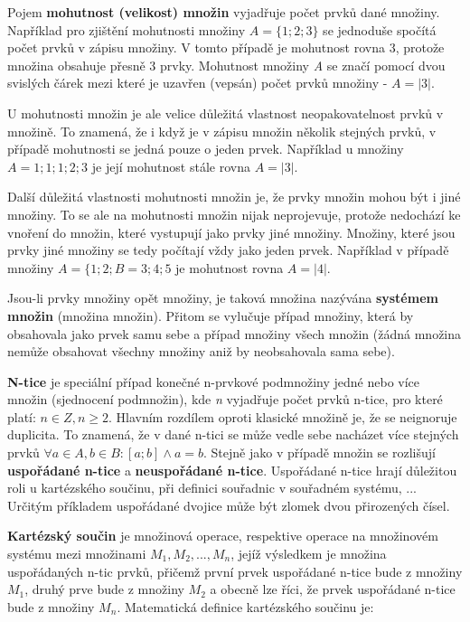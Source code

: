 Pojem {\bf mohutnost (velikost) množin} vyjadřuje počet prvků dané množiny. Například pro zjištění mohutnosti množiny $A = \{1; 2; 3\}$ se jednoduše spočítá počet prvků v zápisu množiny. V tomto případě je mohutnost rovna 3, protože množina obsahuje přesně 3 prvky. Mohutnost množiny {\it A} se značí pomocí dvou svislých čárek mezi které je uzavřen (vepsán) počet prvků množiny - $A = |3| $. 


U mohutnosti množin je ale velice důležitá vlastnost neopakovatelnost prvků v množině. To znamená, že i když je v zápisu množin několik stejných prvků, v případě mohutnosti se jedná pouze o jeden prvek. Například u množiny $A = {1;1;1;2;3}$ je její mohutnost stále rovna $A=|3|$.

Další důležitá vlastnosti mohutnosti množin je, že prvky množin mohou být i jiné množiny. To se ale na mohutnosti množin nijak neprojevuje, protože nedochází ke vnoření do množin, které vystupují jako prvky jiné množiny. Množiny, které jsou prvky jiné množiny se tedy počítají vždy jako jeden prvek. Například v případě množiny $A = \{1; 2; B={3;4}; 5$ je mohutnost rovna $A=|4|$.





Jsou-li prvky množiny opět množiny, je taková množina nazývána {\bf systémem množin} (množina množin). Přitom se vylučuje případ množiny, která by obsahovala jako prvek samu sebe a případ množiny všech množin (žádná množina nemůže obsahovat všechny množiny aniž by neobsahovala sama sebe).



{\bf N-tice} je speciální případ konečné n-prvkové podmnožiny jedné nebo více množin (sjednocení podmnožin), kde {\it n} vyjadřuje počet prvků n-tice, pro které platí: $n \in Z, n \geq 2$.  Hlavním rozdílem oproti klasické množině je, že se neignoruje duplicita. To znamená, že v dané n-tici se může vedle sebe nacházet více stejných prvků $\forall a \in A, b \in B: [a;b] \wedge a = b $. Stejně jako v případě množin se rozlišují {\bf uspořádané n-tice} a  {\bf neuspořádané n-tice}. Uspořádané n-tice hrají důležitou roli u kartézského součinu, při definici souřadnic v souřadném systému, ... Určitým příkladem uspořádané dvojice může být zlomek dvou přirozených čísel.

{\bf Kartézský součin} je množinová operace, respektive operace na množinovém systému mezi množinami $M_1, M_2, ..., M_n$, jejíž výsledkem je množina uspořádaných n-tic prvků, přičemž první prvek uspořádané n-tice bude z množiny $M_1$, druhý prve bude z množiny $M_2$ a obecně lze říci, že prvek uspořádané n-tice bude z množiny $M_n$. Matematická definice kartézského součinu je:

